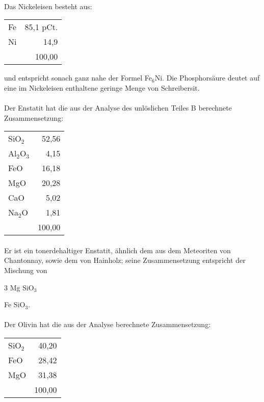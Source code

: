 \documentclass[a4paper, 11pt, oneside]{article}
\begin{document}
\paragraph{}
Das Nickeleisen besteht aus:
\begin{center}
\begin{tabular}{ l r }
    Fe & 85,1 pCt.\\
    Ni & 14,9\\
     & 100,00\\
\end{tabular}
\end{center}
und entspricht sonach ganz nahe der Formel Fe$_{6}$Ni. Die Phosphorsäure deutet auf eine im Nickeleisen enthaltene geringe Menge von Schreibersit.
\paragraph{}
Der Enstatit hat die aus der Analyse des unlöslichen Teiles B berechnete Zusammensetzung:
\begin{center}
\begin{tabular}{ l r }
    SiO$_{2}$ & 52,56\\
    Al$_{2}$O$_{3}$ & 4,15\\
    FeO & 16,18\\
    MgO & 20,28\\
    CaO & 5,02\\
    Na$_{2}$O & 1,81\\
     & 100,00\\
\end{tabular}
\end{center}
\paragraph{}
Er ist ein tonerdehaltiger Enstatit, ähnlich dem aus dem Meteoriten von Chantonnay, sowie dem von Hainholz; seine Zusammensetzung entspricht der Mischung von
\begin{center}
3 Mg SiO$_{3}$
\end{center}
\begin{center}
Fe SiO$_{3}$.
\end{center}
\paragraph{}
Der Olivin hat die aus der Analyse berechnete Zusammensetzung:
\begin{center}
\begin{tabular}{ l r }
    SiO$_{2}$ & 40,20\\
    FeO & 28,42\\
    MgO & 31,38\\
     & 100,00\\
\end{tabular}
\end{center}
\end{document}
